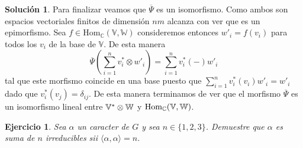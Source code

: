 \documentclass[11pt]{article}
\theoremstyle{plain}
\newtheorem*{ej}{Ejercicio}
\theoremstyle{definition}
\newtheorem*{sol}{Solución}
\theoremstyle{remark}
\newcommand\VV{\mathbb{V}}
\newcommand\WW{\mathbb{W}}
\newcommand\CC{\mathbb{C}}
\begin{document}
\begin{sol}
	
	Para finalizar veamos que $\overline \Psi$ es un isomorfismo. Como ambos son espacios vectoriales finitos de dimensión $nm$ alcanza con ver que es un epimorfismo. Sea $f \in \text{Hom}_\CC(\VV, \WW)$ consideremos entonces $w'_i = f(v_i)$ para todos los $v_i$ de la base de $\VV$. De esta manera 
	\begin{equation*}
	\overline \Psi \left(\sum_{i=1}^{n} v^*_i \otimes w'_i \right) = \sum_{i=1}^{n} v_i^*(-) w'_i
	\end{equation*}
	tal que este morfismo coincide en una base puesto que $\sum_{i=1}^{n} v_i^*(v_i) w'_i = w'_i$ dado que $v_i^{*}(v_j) = \delta_{ij}$. De esta manera terminamos de ver que el morfismo $\overline \Psi$ es un isomorfismo lineal entre $ \Bbb V^* \otimes \WW $ y $ \text{Hom}_\CC (\Bbb V, \Bbb W)$.
\end{sol}
\bigskip

\begin{tcolorbox}[colback=teal!25!white,colframe=teal!75!black]
	\begin{ej}
		Sea $\alpha$ un caracter de $G$ y sea $n \in \{ 1,2,3\}$. Demuestre que $\alpha$ es suma de $n$ irreducibles sii $\langle \alpha, \alpha \rangle = n$.
	\end{ej}	
\end{tcolorbox}
\medskip
\end{document}
